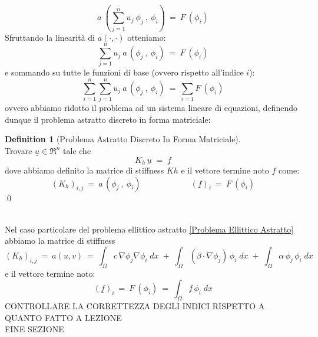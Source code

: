 \documentclass[12pt,a4paper]{report}
\theoremstyle{theorem}
\theoremstyle{definition}
\newtheorem{definition}{Definition}[section]
\begin{document}
\[ a \ \left( \sum_{j = 1}^{n} u_{j} \ \phi_{j} \ , \ \phi_{i} \right) \ = \ F \ \left(  \phi_{i} \right) \]
Sfruttando la linearità di $a(\cdot,\cdot)$ otteniamo:
\[ \sum_{j = 1}^{n} u_{j} \ a \, \left( \phi_{j} \ , \ \phi_{i} \right) \ = \ F \ \left(  \phi_{i} \right) \]
e sommando su tutte le funzioni di base (ovvero rispetto all'indice $i$):
\[ \sum_{i = 1}^{n} \sum_{j = 1}^{n} u_{j} \ a \, \left( \phi_{j} \ , \ \phi_{i} \right) \ = \ \sum_{i = 1} F \ \left(  \phi_{i} \right) \]
ovvero abbiamo ridotto il problema ad un sistema lineare di equazioni, definendo dunque il problema astratto discreto in forma matriciale:
\begin{definition} [Problema Astratto Discreto In Forma Matriciale]  \label{Problema Astratto Discreto In Forma Matriciale}
\hfill \\
Trovare $\underline{u}  \in \Re^{n}$ tale che
\[ K_{h} \, \underline{u} \; = \; \underline{f} \]
dove abbiamo definito la matrice di stiffness $Kh$  \label{Matrice Di Stiffness} e il vettore termine noto $\underline{f}$ come:
\[ (K_{h})_{i,j} \ = \ a \, \left( \phi_{j} \ , \ \phi_{i} \right) \qquad \qquad \qquad (\underline{f})_{i} \ = \ F \ \left(  \phi_{i} \right) \]
\qed
\end{definition}
\hfill \\
Nel caso particolare del problema ellittico astratto \ref{Problema Ellittico Astratto} abbiamo la matrice di stiffness  \label{Matrice Di Stiffness Problema Ellittico}
\[ (K_{h})_{i,j} \ = \ a(u,v) \ = \ \int_{\Omega}{c \, \nabla \phi_{j} \nabla \phi_{i} \; dx} \; + \; \int_{\Omega}{(\beta \cdot \nabla \phi_{j}) \, \phi_{i} \; dx} \; + \; \int_{\Omega}{\alpha \, \phi_{j} \, \phi_{i} \; dx} \]
e il vettore termine noto:
\[ (\underline{f})_{i} \ = \ F \ \left(  \phi_{i} \right) \ = \ \int_{\Omega}{f \, \phi_{i} \; dx} \]
{ \color{red} CONTROLLARE LA CORRETTEZZA DEGLI INDICI RISPETTO A QUANTO FATTO A LEZIONE\\}
{ \color{blue} FINE SEZIONE\\}
\end{document}
